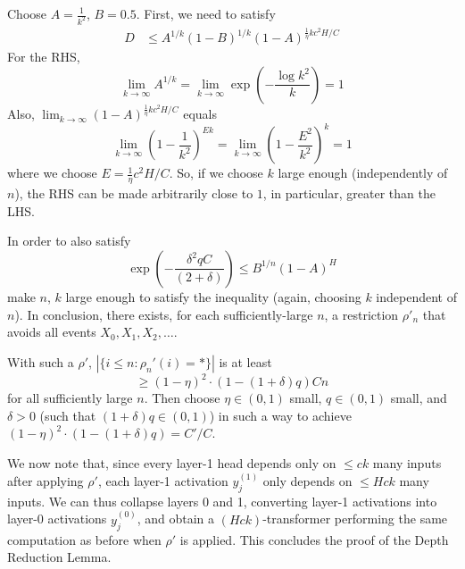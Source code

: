 \documentclass[11pt,a4paper]{article}
\begin{document}
Choose %
$A=\frac{1}{k^2}$, $B=0.5$.
First, we need to satisfy
\begin{align}
    D &\leq A^{1/k}(1-B)^{1/k}(1-A)^{\frac{1}{\eta}kc^2H/C} 
\end{align}
For the RHS, 
\begin{equation}
\lim_{k\rightarrow \infty} A^{1/k} = \lim_{k\rightarrow \infty} \exp\left(-\frac{\log k^2}{k}\right) = 1
\end{equation}
Also, $\lim_{k\rightarrow \infty} (1-A)^{\frac{1}{\eta}kc^2H/C}$ equals
\begin{equation}
\lim_{k\rightarrow \infty} \left(1-\frac{1}{k^2}\right)^{Ek} = \lim_{k\rightarrow \infty} \left(1-\frac{E^2}{k^2}\right)^{k} = 1
\end{equation}
where we choose $E = \frac{1}{\eta}c^2H/C$. So, if we choose $k$ large enough (independently of $n$), the RHS can be made arbitrarily close to $1$, in particular, greater than the LHS.

In order to also satisfy
\begin{equation}
\exp\left(-\frac{\delta^2qC}{(2+\delta)}\right)  \leq B^{1/n} (1-A)^H
\end{equation}
make $n$, $k$ large enough to satisfy the inequality (again, choosing $k$ independent of $n$). %
In conclusion, there exists, for each sufficiently-large $n$, a restriction $\rho'_n$ that avoids all events $X_0, X_1, X_2, \dots$.

With such a $\rho'$, $|\{i \leq n: \rho_n'(i) = *\}|$ is at least
\begin{equation}
\geq (1-\eta)^2\cdot (1-(1+\delta)q) C n
\end{equation}
for all sufficiently large $n$.
Then choose $\eta \in (0,1)$ small, $q \in (0,1)$ small, and $\delta >0$ (such that $(1+\delta)q \in (0,1)$) in such a way to achieve $(1-\eta)^2\cdot (1-(1+\delta)q) = C'/C$.




We now note that, since every layer-1 head depends only on $\leq ck$ many inputs after applying $\rho'$, each layer-1 activation $y_j^{(1)}$ only depends on $\leq Hck$ many inputs.
We can thus collapse layers 0 and 1, converting layer-1 activations into layer-0 activations $y_j^{(0)}$, and obtain a $(Hck)$-transformer performing the same computation as before when $\rho'$ is applied.
This concludes the proof of the Depth Reduction Lemma.
\end{document}
